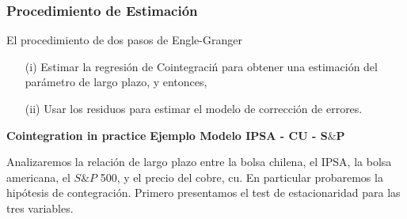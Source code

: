 	
		\subsubsection{Procedimiento de Estimaci\'on}
		El procedimiento de dos pasos de Engle-Granger\\
		
			\begin{itemize}
				\item[(i)] Estimar la regresi\'on de Cointegraci\'n para obtener una estimaci\'on del par\'ametro de largo plazo, y entonces,
				\item[(ii)] Usar los residuos para estimar el modelo de correcci\'on de errores.
			\end{itemize}
		
\textbf{Cointegration in practice}
		\textbf{Ejemplo Modelo IPSA - CU - S$\&$P}
		
		Analizaremos la relaci\'on de largo plazo entre la bolsa chilena, el IPSA, la bolsa americana, el $S\&P$ 500, y el precio del cobre, cu. En particular probaremos la hip\'otesis de contegraci\'on. Primero presentamos el test de estacionaridad para las tres variables.
		
				
%				
				
